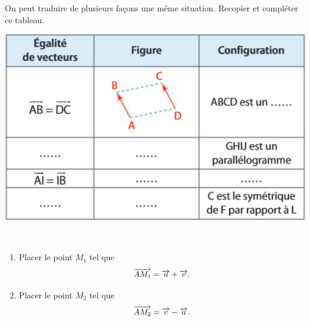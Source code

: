 \documentclass[11pt]{article}
\begin{document}
\begin{exo}
  {\small On peut traduire de plusieurs façons une même situation. Recopier et compléter
  ce tableau.}
  \begin{center}
    \includegraphics[scale=.5]{tableau.png}
  \end{center}
\end{exo}

\begin{exo}~\\
  \begin{minipage}[]{.35\textwidth}
    \begin{enumerate}
      \item Placer le point $M_1$ tel que
        \[
          \overrightarrow{AM_1} = \overrightarrow{u}+\overrightarrow{v}.
        \]
      \item Placer le point $M_2$ tel que 
        \[
          \overrightarrow{AM_2} = \overrightarrow{v}-\overrightarrow{u}.
        \]
    \end{enumerate}
  \end{minipage}
  \begin{minipage}[]{.65\textwidth}
    \begin{center}
    \end{center}
  \end{minipage}
\end{exo}
\end{document}

